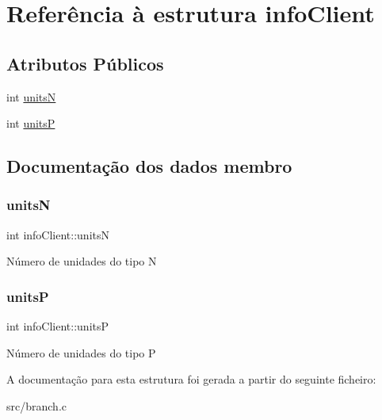 \hypertarget{structinfoClient}{}\section{Referência à estrutura info\+Client}
\label{structinfoClient}
\subsection*{Atributos Públicos}
\begin{DoxyCompactItemize}
\item 
int \hyperlink{structinfoClient_a8cbbe858018f476e2354ab81fa072d11}{unitsN}
\item 
int \hyperlink{structinfoClient_a8cd040ee2cf314e9b1a084317545e7f0}{unitsP}
\end{DoxyCompactItemize}


\subsection{Documentação dos dados membro}
\mbox{\label{structinfoClient_a8cbbe858018f476e2354ab81fa072d11}} 
\subsubsection{\texorpdfstring{unitsN}{unitsN}}
{\footnotesize\ttfamily int info\+Client\+::unitsN}

Número de unidades do tipo N \mbox{\label{structinfoClient_a8cd040ee2cf314e9b1a084317545e7f0}} 
\subsubsection{\texorpdfstring{unitsP}{unitsP}}
{\footnotesize\ttfamily int info\+Client\+::unitsP}

Número de unidades do tipo P 

A documentação para esta estrutura foi gerada a partir do seguinte ficheiro\+:\begin{DoxyCompactItemize}
\item 
src/branch.\+c\end{DoxyCompactItemize}
